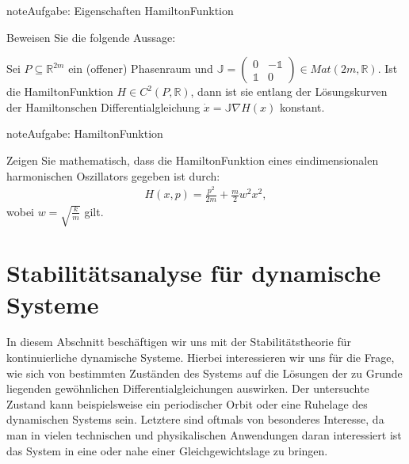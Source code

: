 \documentclass[letterpaper,10pt,english]{jupyterBook}
\begin{document}
\begin{sphinxadmonition}{note}{Aufgabe: Eigenschaften Hamilton\sphinxhyphen{}Funktion}

\sphinxAtStartPar
Beweisen Sie die folgende Aussage:

\sphinxAtStartPar
Sei \(P \subseteq \mathbb{R}^{2m}\) ein (offener) Phasenraum und \(\mathbb{J} = \begin{pmatrix} 0 & - 𝟙 \\ 𝟙 & 0 \end{pmatrix} \in Mat(2m, \mathbb{R})\). Ist die Hamilton\sphinxhyphen{}Funktion \(H \in C^2(P, \mathbb{R})\), dann ist sie entlang der Lösungskurven der Hamiltonschen Differentialgleichung \(\dot x = \mathbb{J} \nabla H(x)\) konstant.
\end{sphinxadmonition}

\begin{sphinxadmonition}{note}{Aufgabe: Hamilton\sphinxhyphen{}Funktion}

\sphinxAtStartPar
Zeigen Sie mathematisch, dass die Hamilton\sphinxhyphen{}Funktion eines eindimensionalen harmonischen Oszillators gegeben ist durch:
\begin{equation*}
\begin{split}H(x,p) = \frac{p^2}{2m} + \frac{m}{2} w^2 x^2,\end{split}
\end{equation*}
\sphinxAtStartPar
wobei \(w = \sqrt{\frac{k}{m}}\) gilt.
\end{sphinxadmonition}


\chapter{Stabilitätsanalyse für dynamische Systeme}
\label{\detokenize{odestability/stabilitaetsanalyse:stabilitatsanalyse-fur-dynamische-systeme}}\label{\detokenize{odestability/stabilitaetsanalyse::doc}}
\sphinxAtStartPar
In diesem Abschnitt beschäftigen wir uns mit der Stabilitätstheorie für kontinuierliche dynamische Systeme.
Hierbei interessieren wir uns für die Frage, wie sich  von bestimmten Zuständen des Systems auf die Lösungen der zu Grunde liegenden gewöhnlichen Differentialgleichungen auswirken.
Der untersuchte Zustand kann beispielsweise ein periodischer Orbit oder eine Ruhelage des dynamischen Systems sein.
Letztere sind oftmals von besonderes Interesse, da man in vielen technischen und physikalischen Anwendungen daran interessiert ist das System in eine oder nahe einer Gleichgewichtslage zu bringen.
\end{document}

